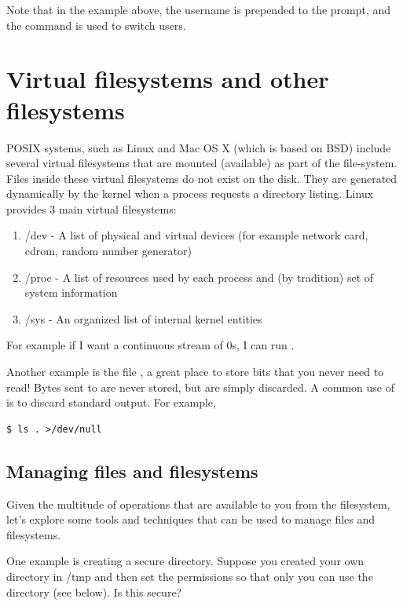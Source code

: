 Note that in the example above, the username is prepended to the prompt, and the command  is used to switch users.

\section{Virtual filesystems and other filesystems}

POSIX systems, such as Linux and Mac OS X (which is based on BSD) include several virtual filesystems that are mounted (available) as part of the file-system.
Files inside these virtual filesystems do not exist on the disk.
They are generated dynamically by the kernel when a process requests a directory listing.
Linux provides 3 main virtual filesystems:

\begin{enumerate}
    \item /dev  - A list of physical and virtual devices (for example network card, cdrom, random number generator)
    \item /proc - A list of resources used by each process and (by tradition) set of system information
    \item /sys - An organized list of internal kernel entities
\end{enumerate}

For example if I want a continuous stream of 0s, I can run .

Another example is the file , a great place to store bits that you never need to read!
Bytes sent to  are never stored, but are simply discarded.
A common use of  is to discard standard output.
For example,

\begin{verbatim}
$ ls . >/dev/null
\end{verbatim}

\subsection{Managing files and filesystems}

Given the multitude of operations that are available to you from the filesystem, let's explore some tools and techniques that can be used to manage files and filesystems.

One example is creating a secure directory.
Suppose you created your own directory in /tmp and then set the permissions so that only you can use the directory (see below).
Is this secure?

